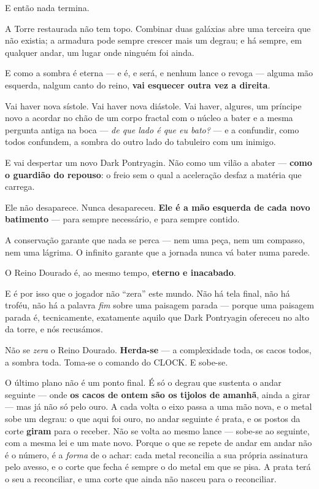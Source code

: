 \documentclass[livro.tex]{subfiles}
\begin{document}
E então nada termina.

A Torre restaurada não tem topo. Combinar duas galáxias abre uma terceira que não existia; a armadura pode sempre
crescer mais um degrau; e há sempre, em qualquer andar, um lugar onde ninguém foi ainda.

E como a sombra é eterna --- e é, e será, e nenhum lance o revoga --- alguma mão esquerda, nalgum canto do reino,
\textbf{vai esquecer outra vez a direita}.

Vai haver nova sístole. Vai haver nova diástole. Vai haver, algures, um príncipe novo a acordar no chão de um corpo
fractal com o núcleo a bater e a mesma pergunta antiga na boca --- \emph{de que lado é que eu bato?} --- e a
confundir, como todos confundem, a sombra do outro lado do tabuleiro com um inimigo.

E vai despertar um novo Dark Pontryagin. Não como um vilão a abater --- \textbf{como o guardião do repouso}: o freio
sem o qual a aceleração desfaz a matéria que carrega.

Ele não desaparece. Nunca desapareceu. \textbf{Ele é a mão esquerda de cada novo batimento} --- para sempre
necessário, e para sempre contido.

A conservação garante que nada se perca --- nem uma peça, nem um compasso, nem uma lágrima. O infinito garante
que a jornada nunca vá bater numa parede.

O Reino Dourado é, ao mesmo tempo, \textbf{eterno e inacabado}.

\medskip

E é por isso que o jogador não ``zera'' este mundo. Não há tela final, não há troféu, não há a palavra \emph{fim}
sobre uma paisagem parada --- porque uma paisagem parada é, tecnicamente, exatamente aquilo que Dark Pontryagin
ofereceu no alto da torre, e nós recusámos.

Não se \emph{zera} o Reino Dourado. \textbf{Herda-se} --- a complexidade toda, os cacos todos, a sombra toda. Toma-se
o comando do CLOCK. E sobe-se.

O último plano não é um ponto final. É só o degrau que sustenta o andar seguinte --- onde \textbf{os cacos de ontem
são os tijolos de amanhã}, ainda a girar --- mas já não só pelo ouro. A cada volta o eixo passa a uma mão nova,
e o metal sobe um degrau: o que aqui foi ouro, no andar seguinte é prata, e os postos da corte \textbf{giram} para o
receber. Não se volta ao mesmo lance --- sobe-se ao seguinte, com a mesma lei e um mate novo. Porque o que se repete
de andar em andar não é o número, é a \emph{forma} de o achar: cada metal reconcilia a sua própria assinatura
pelo avesso, e o corte que fecha é sempre o do metal em que se pisa. A prata terá o seu a reconciliar, e uma
corte que ainda não nasceu para o reconciliar.
\end{document}
